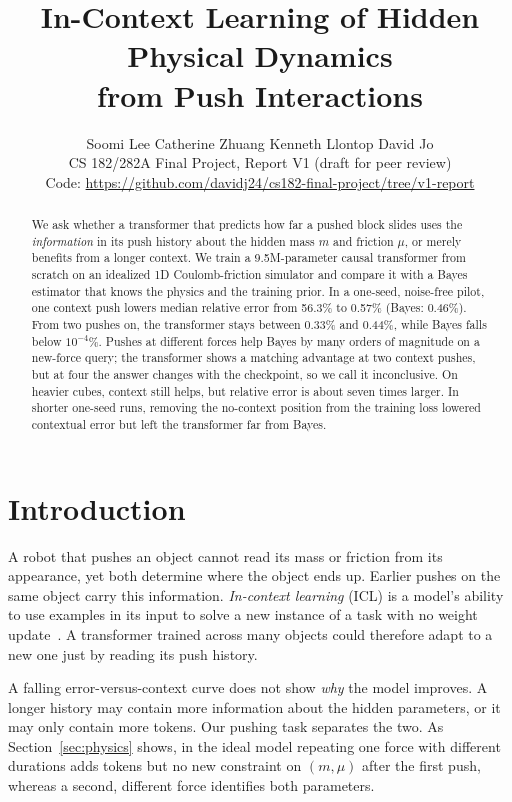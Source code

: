 \documentclass{article}
\title{In-Context Learning of Hidden Physical Dynamics\\from Push Interactions}
\author{Soomi Lee \quad Catherine Zhuang \quad Kenneth Llontop \quad David Jo\\
CS 182/282A Final Project, Report V1 (draft for peer review)\\
{\small Code: \url{https://github.com/davidj24/cs182-final-project/tree/v1-report}}}
\begin{document}
\maketitle

\begin{abstract}
We ask whether a transformer that predicts how far a pushed block slides uses the \emph{information} in its push history about the hidden mass $m$ and friction $\mu$, or merely benefits from a longer context. We train a 9.5M-parameter causal transformer from scratch on an idealized 1D Coulomb-friction simulator and compare it with a Bayes estimator that knows the physics and the training prior. In a one-seed, noise-free pilot, one context push lowers median relative error from 56.3\% to 0.57\% (Bayes: 0.46\%). From two pushes on, the transformer stays between 0.33\% and 0.44\%, while Bayes falls below $10^{-4}\%$. Pushes at different forces help Bayes by many orders of magnitude on a new-force query; the transformer shows a matching advantage at two context pushes, but at four the answer changes with the checkpoint, so we call it inconclusive. On heavier cubes, context still helps, but relative error is about seven times larger. In shorter one-seed runs, removing the no-context position from the training loss lowered contextual error but left the transformer far from Bayes.
\end{abstract}

\section{Introduction}
A robot that pushes an object cannot read its mass or friction from its appearance, yet both determine where the object ends up. Earlier pushes on the same object carry this information. \emph{In-context learning} (ICL) is a model's ability to use examples in its input to solve a new instance of a task with no weight update~\cite{brown2020}. A transformer trained across many objects could therefore adapt to a new one just by reading its push history.

A falling error-versus-context curve does not show \emph{why} the model improves. A longer history may contain more information about the hidden parameters, or it may only contain more tokens. Our pushing task separates the two. As Section~\ref{sec:physics} shows, in the ideal model repeating one force with different durations adds tokens but no new constraint on $(m,\mu)$ after the first push, whereas a second, different force identifies both parameters.
\end{document}

